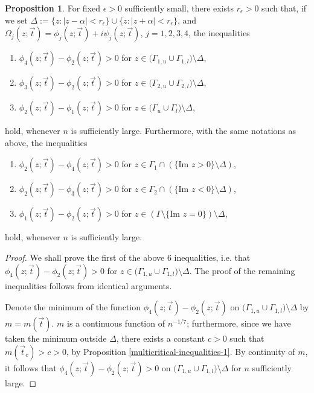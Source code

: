 \documentclass[usenames,dvipsnames]{article}
\theoremstyle{definition}
\newtheorem{prop}{Proposition}[section]
\numberwithin{equation}{section}
\numberwithin{figure}{section}
\begin{document}
\begin{prop}\label{global-inequalities-modified}
    For fixed $\epsilon > 0$ sufficiently small, there exists $r_{\epsilon} >0$ such that, if we set $\Delta := \{z : |z-\alpha| < r_{\epsilon} \} \cup\{z : |z+\alpha| < r_{\epsilon} \}$, and $\Omega_j(z;\vec{t}) = \phi_j(z;\vec{t}) + i\psi_j(z;\vec{t})$, $j=1,2,3,4$, the inequalities 
            \begin{enumerate}
                \item  $\phi_4(z;\vec{t}) - \phi_2(z;\vec{t}) > 0$ for $z \in \big(\Gamma_{1,u}\cup\Gamma_{1,l}\big) \setminus \Delta$,
                \item  $\phi_3(z;\vec{t}) - \phi_2(z;\vec{t}) > 0$ for $z \in \big(\Gamma_{2,u}\cup\Gamma_{2,l}\big) \setminus \Delta$,
                \item  $\phi_2(z;\vec{t}) - \phi_{1}(z;\vec{t}) > 0$ for $z \in \big(\Gamma_{u}\cup\Gamma_{l}\big) \setminus \Delta$,
            \end{enumerate}
    hold, whenever $n$ is sufficiently large. 
    Furthermore, with the same notations as above, the inequalities
        \begin{enumerate}
            \item  $\phi_2(z;\vec{t}) - \phi_4(z;\vec{t}) > 0$ for $z \in \Gamma_1 \cap (\{\text{Im } z > 0\} \setminus \Delta)$,
            \item  $\phi_2(z;\vec{t}) - \phi_3(z;\vec{t}) > 0$ for $z \in \Gamma_2 \cap (\{\text{Im } z < 0\} \setminus \Delta)$,
            \item  $\phi_1(z;\vec{t}) - \phi_2(z;\vec{t}) > 0$ for $z \in (\Gamma \setminus \{\text{Im } z = 0\})\setminus \Delta$,
        \end{enumerate}
    hold, whenever $n$ is sufficiently large. 
\end{prop}
\begin{proof}
    We shall prove the first of the above $6$ inequalities, i.e. that 
    $\phi_4(z;\vec{t}) - \phi_2(z;\vec{t}) > 0$ for $z \in \big(\Gamma_{1,u}\cup\Gamma_{1,l}\big) \setminus \Delta$. The proof of the remaining inequalities follows from identical arguments. 
    
    Denote the minimum of the function $\phi_4(z;\vec{t}) - \phi_2(z;\vec{t})$ on $\big(\Gamma_{1,u}\cup\Gamma_{1,l}\big) \setminus \Delta$ by $m = m(\vec{t})$. $m$ is a continuous function of $n^{-1/7}$; furthermore, since we have taken the minimum outside $\Delta$, there exists a constant $c>0$  such that $m(\vec{t}_c) > c > 0$, by Proposition \ref{multicritical-inequalities-1}. By continuity of $m$, it follows that $\phi_4(z;\vec{t}) - \phi_2(z;\vec{t}) > 0$ on $\big(\Gamma_{1,u}\cup\Gamma_{1,l}\big) \setminus \Delta$ for $n$ sufficiently large.
\end{proof}
\end{document}
